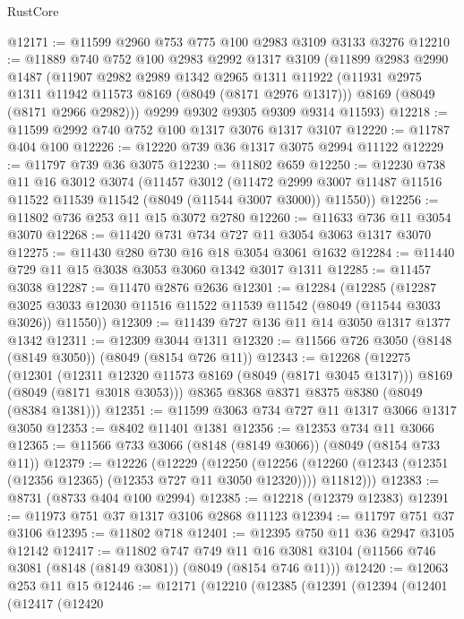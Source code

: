 \begin{lexlean}{RustCore}
\begin{coremodule}
@12171 := @11599 @2960 @753 @775 @100 @2983 @3109 @3133 @3276
@12210 := @11889
    @740
    @752
    @100
    @2983
    @2992
    @1317
    @3109
    (@11899
      @2983
      @2990
      @1487
      (@11907
        @2982
        @2989
        @1342
        @2965
        @1311
        @11922
        (@11931 @2975 @1311 @11942 @11573 @8169 (@8049 (@8171 @2976 @1317)))
        @8169
        (@8049 (@8171 @2966 @2982)))
      @9299
      @9302
      @9305
      @9309
      @9314
      @11593)
@12218 := @11599 @2992 @740 @752 @100 @1317 @3076 @1317 @3107
@12220 := @11787 @404 @100
@12226 := @12220 @739 @36 @1317 @3075 @2994 @11122
@12229 := @11797 @739 @36 @3075
@12230 := @11802 @659
@12250 := @12230
    @738
    @11
    @16
    @3012
    @3074
    (@11457
      @3012
      (@11472 @2999 @3007 @11487 @11516 @11522 @11539 @11542 (@8049 (@11544 @3007 @3000)) @11550))
@12256 := @11802 @736 @253 @11 @15 @3072 @2780
@12260 := @11633 @736 @11 @3054 @3070
@12268 := @11420 @731 @734 @727 @11 @3054 @3063 @1317 @3070
@12275 := @11430 @280 @730 @16 @18 @3054 @3061 @1632
@12284 := @11440 @729 @11 @15 @3038 @3053 @3060 @1342 @3017 @1311
@12285 := @11457 @3038
@12287 := @11470 @2876 @2636
@12301 := @12284
    (@12285
      (@12287 @3025 @3033 @12030 @11516 @11522 @11539 @11542 (@8049 (@11544 @3033 @3026)) @11550))
@12309 := @11439 @727 @136 @11 @14 @3050 @1317 @1377 @1342
@12311 := @12309 @3044 @1311
@12320 := @11566 @726 @3050 (@8148 (@8149 @3050)) (@8049 (@8154 @726 @11))
@12343 := @12268
    (@12275
      (@12301
        (@12311 @12320 @11573 @8169 (@8049 (@8171 @3045 @1317)))
        @8169
        (@8049 (@8171 @3018 @3053)))
      @8365
      @8368
      @8371
      @8375
      @8380
      (@8049 (@8384 @1381)))
@12351 := @11599 @3063 @734 @727 @11 @1317 @3066 @1317 @3050
@12353 := @8402 @11401 @1381
@12356 := @12353 @734 @11 @3066
@12365 := @11566 @733 @3066 (@8148 (@8149 @3066)) (@8049 (@8154 @733 @11))
@12379 := @12226
    (@12229
      (@12250
        (@12256 (@12260 (@12343 (@12351 (@12356 @12365) (@12353 @727 @11 @3050 @12320)))) @11812)))
@12383 := @8731 (@8733 @404 @100 @2994)
@12385 := @12218 (@12379 @12383)
@12391 := @11973 @751 @37 @1317 @3106 @2868 @11123
@12394 := @11797 @751 @37 @3106
@12395 := @11802 @718
@12401 := @12395 @750 @11 @36 @2947 @3105 @12142
@12417 := @11802
    @747
    @749
    @11
    @16
    @3081
    @3104
    (@11566 @746 @3081 (@8148 (@8149 @3081)) (@8049 (@8154 @746 @11)))
@12420 := @12063 @253 @11 @15
@12446 := @12171
    (@12210
      (@12385
        (@12391
          (@12394
            (@12401
              (@12417
                (@12420

\end{coremodule}
\end{lexlean}
